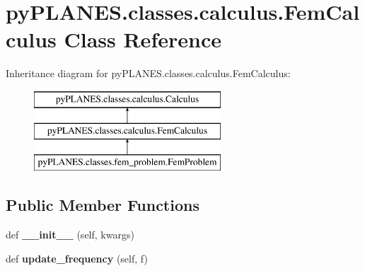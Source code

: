 \hypertarget{classpy_p_l_a_n_e_s_1_1classes_1_1calculus_1_1_fem_calculus}{}\section{py\+P\+L\+A\+N\+E\+S.\+classes.\+calculus.\+Fem\+Calculus Class Reference}
\label{classpy_p_l_a_n_e_s_1_1classes_1_1calculus_1_1_fem_calculus}
Inheritance diagram for py\+P\+L\+A\+N\+E\+S.\+classes.\+calculus.\+Fem\+Calculus\+:\begin{figure}[H]
\begin{center}
\leavevmode
\includegraphics[height=3.000000cm]{classpy_p_l_a_n_e_s_1_1classes_1_1calculus_1_1_fem_calculus}
\end{center}
\end{figure}
\subsection*{Public Member Functions}
\begin{DoxyCompactItemize}
\item 
\mbox{\label{classpy_p_l_a_n_e_s_1_1classes_1_1calculus_1_1_fem_calculus_aa0f7fb6a02400e5ac425b41e8b9463f9}} 
def {\bfseries \+\_\+\+\_\+init\+\_\+\+\_\+} (self, kwargs)
\item 
\mbox{\label{classpy_p_l_a_n_e_s_1_1classes_1_1calculus_1_1_fem_calculus_ab129ddbbce45f69afc2422acb4edbc0a}} 
def {\bfseries update\+\_\+frequency} (self, f)
\end{DoxyCompactItemize}
